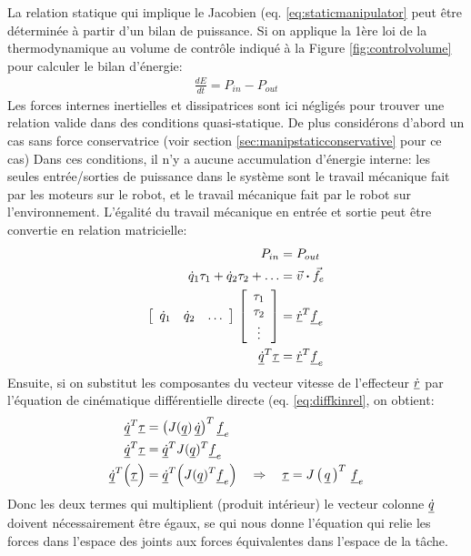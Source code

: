 La relation statique qui implique le Jacobien (eq. \eqref{eq:staticmanipulator} peut être déterminée à partir d'un bilan de puissance. Si on applique la 1ère loi de la thermodynamique au volume de contrôle indiqué à la Figure \ref{fig:controlvolume} pour calculer le bilan d'énergie:
\begin{align}
\frac{dE}{dt} = P_{in} - P_{out}
\end{align}
Les forces internes inertielles et dissipatrices sont ici négligés pour trouver une relation valide dans des conditions quasi-statique. De plus considérons d'abord un cas sans force conservatrice (voir section \ref{sec:manipstaticconservative} pour ce cas) Dans ces conditions, il n'y a aucune accumulation d'énergie interne: les seules entrée/sorties de puissance dans le système sont le travail mécanique fait par les moteurs sur le robot, et le travail mécanique fait par le robot sur l'environnement. L'égalité du travail mécanique en entrée et sortie peut être convertie en relation matricielle:
\begin{align}
P_{in} &= P_{out} \\
\dot{q}_1 \tau_1  + \dot{q}_2 \tau_2 + \hdots  &= \Vec{v} \boldsymbol{\cdot} \Vec{f}_e \\
\left[ \begin{array}{c c c} 
\dot{q}_1 & \dot{q}_2 & \hdots 
\end{array} \right] \,
\left[ \begin{array}{c} 
\tau_1 \\ \tau_2 \\ \vdots 
\end{array} \right] &= \underline{\dot{r}}^T \underline{f}_e \\
\underline{\dot{q}}^T \underline{\tau} &= \underline{\dot{r}}^T \underline{f}_e \\
\end{align}
Ensuite, si on substitut les composantes du vecteur vitesse de l'effecteur $\underline{\dot{r}}$ par l'équation de cinématique différentielle directe (eq. \eqref{eq:diffkinrel}, on obtient:
\begin{align}
\underline{\dot{q}}^T \underline{\tau} &= \left( J( \underline{q}) \,  \underline{\dot{q}}  \right)^T \underline{f}_e \\
\underline{\dot{q}}^T \underline{\tau} &= \underline{\dot{q}}^T  J( \underline{q})^T \underline{f}_e    \\
\underline{\dot{q}}^T \Big( \underline{\tau} \Big) &= \underline{\dot{q}}^T  \Big( J( \underline{q})^T \underline{f}_e \Big)   
\quad \Rightarrow \quad \underline{\tau} = J\left( \, \underline{q} \, \right)^T \, \underline{f}_e 
\end{align}
Donc les deux termes qui multiplient (produit intérieur) le vecteur colonne $\underline{\dot{q}}$ doivent nécessairement être égaux, se qui nous donne l'équation qui relie les forces dans l'espace des joints aux forces équivalentes dans l'espace de la tâche. 


